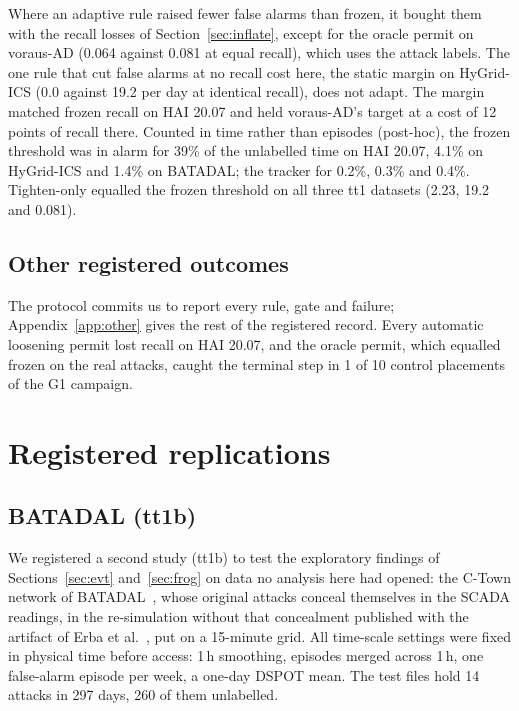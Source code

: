 \documentclass[sigconf,review,anonymous]{acmart}
\begin{document}
Where an adaptive rule raised fewer false alarms than frozen, it bought them with the recall losses of Section~\ref{sec:inflate}, except for the oracle permit on voraus-AD (0.064 against 0.081 at equal recall), which uses the attack labels. The one rule that cut false alarms at no recall cost here, the static
margin on HyGrid-ICS (0.0 against 19.2 per day at identical recall), does not adapt. The margin
matched frozen recall on HAI 20.07 and held voraus-AD's target at a cost of 12 points of recall
there. Counted in time rather than episodes (post-hoc), the frozen threshold was in alarm for 39\% of
the unlabelled time on HAI 20.07, 4.1\% on HyGrid-ICS and 1.4\% on BATADAL; the tracker for 0.2\%, 0.3\%
and 0.4\%. Tighten-only equalled the frozen threshold on all three tt1 datasets (2.23, 19.2 and 0.081).

\subsection{Other registered outcomes}
\label{sec:other}

The protocol commits us to report every rule, gate and failure; Appendix~\ref{app:other} gives the rest
of the registered record. Every automatic loosening permit lost recall on HAI 20.07, and the oracle
permit, which equalled frozen on the real attacks, caught the terminal step in 1 of 10 control
placements of the G1 campaign.

\section{Registered replications}
\label{sec:replications}

\subsection{BATADAL (tt1b)}
\label{sec:batadal}

We registered a second study (tt1b) to test the exploratory findings of Sections~\ref{sec:evt}
and~\ref{sec:frog} on data no analysis here had opened: the C-Town network of
BATADAL~\cite{taormina2018batadal}, whose original attacks conceal themselves in the SCADA readings,
in the re-simulation without that concealment published with the artifact of Erba
et al.~\cite{erba2020concealment}, put on a 15-minute grid. All time-scale settings were fixed in
physical time before access: 1\,h smoothing, episodes merged across 1\,h, one false-alarm episode per
week, a one-day DSPOT mean. The test files hold 14 attacks in 297 days, 260 of them unlabelled.
\end{document}
